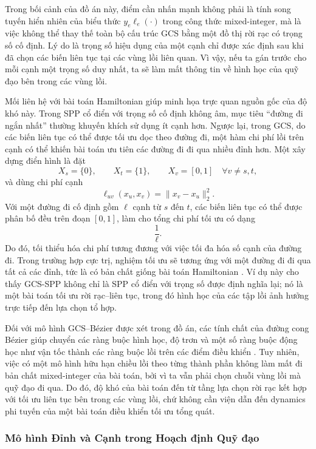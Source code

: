 Trong bối cảnh của đồ án này, điểm cần nhấn mạnh không phải là tính song
tuyến hiển nhiên của biểu thức $y_e \ell_e(\cdot)$ trong công thức
mixed-integer, mà là việc không thể thay thế toàn bộ cấu trúc GCS bằng một đồ
thị rời rạc có trọng số cố định. Lý do là trọng số hiệu dụng của một cạnh chỉ
được xác định sau khi đã chọn các biến liên tục tại các vùng lồi liên quan. Vì
vậy, nếu ta gán trước cho mỗi cạnh một trọng số duy nhất, ta sẽ làm mất thông
tin về hình học của quỹ đạo bên trong các vùng lồi.

Mối liên hệ với bài toán Hamiltonian giúp minh họa trực quan nguồn gốc của độ
khó này. Trong SPP cổ điển với trọng số cố định không âm, mục tiêu ``đường đi
ngắn nhất'' thường khuyến khích sử dụng ít cạnh hơn. Ngược lại, trong GCS, do
các biến liên tục có thể được tối ưu dọc theo đường đi, một hàm chi phí lồi
trên cạnh có thể khiến bài toán ưu tiên các đường đi đi qua nhiều đỉnh hơn. Một
xây dựng điển hình là đặt
\[
  X_s=\{0\}, \qquad
  X_t=\{1\}, \qquad
  X_v=[0,1] \quad \forall v\neq s,t,
\]
và dùng chi phí cạnh
\[
  \ell_{uv}(x_u,x_v)=\|x_v-x_u\|_2^2 .
\]
Với một đường đi cố định gồm $\ell$ cạnh từ $s$ đến $t$, các biến liên tục có
thể được phân bố đều trên đoạn $[0,1]$, làm cho tổng chi phí tối ưu có dạng
\[
  \frac{1}{\ell}.
\]
Do đó, tối thiểu hóa chi phí tương đương với việc tối đa hóa số cạnh của đường
đi. Trong trường hợp cực trị, nghiệm tối ưu sẽ tương ứng với một đường đi đi
qua tất cả các đỉnh, tức là có bản chất giống bài toán Hamiltonian
\cite{Marcucci2024Thesis}. Ví dụ này cho thấy GCS-SPP không chỉ là SPP cổ điển
với trọng số được định nghĩa lại; nó là một bài toán tối ưu rời rạc--liên tục,
trong đó hình học của các tập lồi ảnh hưởng trực tiếp đến lựa chọn tổ hợp.

Đối với mô hình GCS--Bézier được xét trong đồ án, các tính chất của đường
cong Bézier giúp chuyển các ràng buộc hình học, độ trơn và một số ràng buộc
động học như vận tốc thành các ràng buộc lồi trên các điểm điều khiển
\cite{Marcucci2024Thesis}. Tuy nhiên, việc có một mô hình hữu hạn
chiều lồi theo từng thành phần không làm mất đi bản chất mixed-integer của bài
toán, bởi vì ta vẫn phải chọn chuỗi vùng lồi mà quỹ đạo đi qua. Do đó, độ khó
của bài toán đến từ tầng lựa chọn rời rạc kết hợp với tối ưu liên tục bên trong
các vùng lồi, chứ không cần viện dẫn đến dynamics phi tuyến của một bài toán
điều khiển tối ưu tổng quát.

\subsubsection{Mô hình Đỉnh và Cạnh trong Hoạch định Quỹ đạo}
\label{subsubsec:gcs_vertex_edge}

